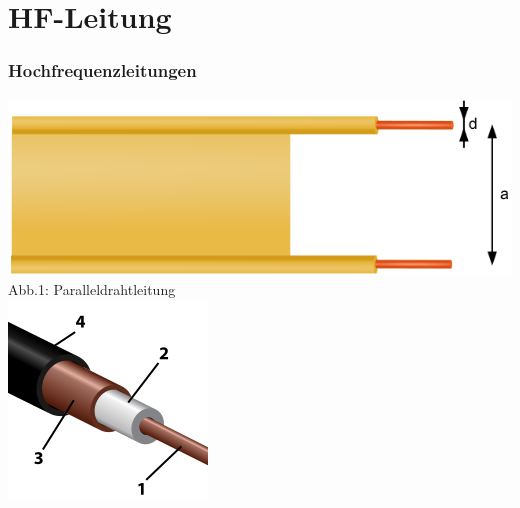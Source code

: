

\subtitle{Technik Klasse A 10: \\
  HF-Leitungen \& Kabel \\[2em]}
\date{Stand 03.06.2016}



\section*{HF-Leitung}
\begin{frame}
  \frametitle{Hochfrequenzleitungen}
  \begin{center}
    \includegraphics[width=\textwidth,height=.35\textheight,keepaspectratio]{a10/parallel.png}\\
    {\tiny Abb.1: Paralleldrahtleitung \cite{wp}}
    \\
    \includegraphics[width=\textwidth,height=.35\textheight,keepaspectratio]{a10/coax.png}\\

\end{center}
\end{frame}

